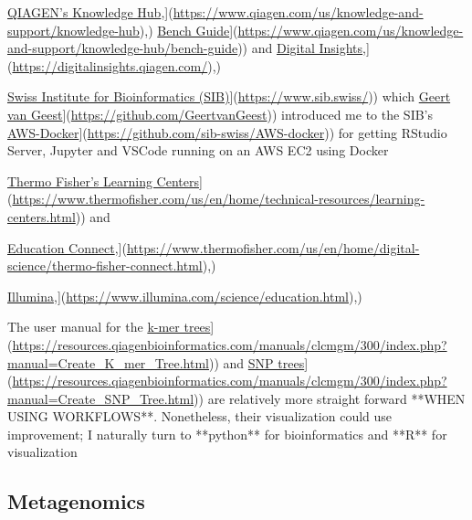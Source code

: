 \documentclass[
]{book}
\begin{document}
\href{\%5Bhttps://www.qiagen.com/us/knowledge-and-support/knowledge-hub}{QIAGEN's Knowledge Hub},{]}(\url{https://www.qiagen.com/us/knowledge-and-support/knowledge-hub}),) \href{\%5Bhttps://www.qiagen.com/us/knowledge-and-support/knowledge-hub/bench-guide}{Bench Guide}{]}(\url{https://www.qiagen.com/us/knowledge-and-support/knowledge-hub/bench-guide})) and \href{\%5Bhttps://digitalinsights.qiagen.com/}{Digital Insights},{]}(\url{https://digitalinsights.qiagen.com/}),)

\href{\%5Bhttps://www.sib.swiss/}{Swiss Institute for Bioinformatics (SIB)}{]}(\url{https://www.sib.swiss/})) which \href{\%5Bhttps://github.com/GeertvanGeest}{Geert van Geest}{]}(\url{https://github.com/GeertvanGeest})) introduced me to the SIB's \href{\%5Bhttps://github.com/sib-swiss/AWS-docker}{AWS-Docker}{]}(\url{https://github.com/sib-swiss/AWS-docker})) for getting RStudio Server, Jupyter and VSCode running on an AWS EC2 using Docker

\href{\%5Bhttps://www.thermofisher.com/us/en/home/technical-resources/learning-centers.html}{Thermo Fisher's Learning Centers}{]}(\url{https://www.thermofisher.com/us/en/home/technical-resources/learning-centers.html})) and

\href{\%5Bhttps://www.thermofisher.com/us/en/home/digital-science/thermo-fisher-connect.html}{Education Connect},{]}(\url{https://www.thermofisher.com/us/en/home/digital-science/thermo-fisher-connect.html}),)

\href{\%5Bhttps://www.illumina.com/science/education.html}{Illumina},{]}(\url{https://www.illumina.com/science/education.html}),)

The user manual for the \href{\%5Bhttps://resources.qiagenbioinformatics.com/manuals/clcmgm/300/index.php?manual=Create_K_mer_Tree.html}{k-mer trees}{]}(\url{https://resources.qiagenbioinformatics.com/manuals/clcmgm/300/index.php?manual=Create_K_mer_Tree.html})) and \href{\%5Bhttps://resources.qiagenbioinformatics.com/manuals/clcmgm/300/index.php?manual=Create_SNP_Tree.html}{SNP trees}{]}(\url{https://resources.qiagenbioinformatics.com/manuals/clcmgm/300/index.php?manual=Create_SNP_Tree.html})) are relatively more straight forward **WHEN USING WORKFLOWS**. Nonetheless, their visualization could use improvement; I naturally turn to **python** for bioinformatics and **R** for visualization

\subsection{Metagenomics}\label{metagenomics}
\end{document}
